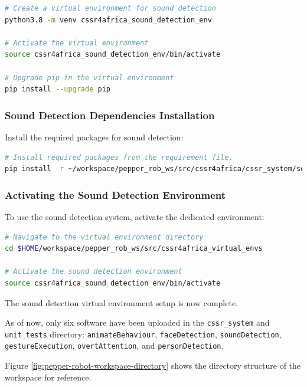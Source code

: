\documentclass{CSSRforAfrica}
\begin{document}
{\begin{lstlisting}[style=withoutNumbering, language=bash]
# Create a virtual environment for sound detection
python3.8 -m venv cssr4africa_sound_detection_env

# Activate the virtual environment
source cssr4africa_sound_detection_env/bin/activate

# Upgrade pip in the virtual environment
pip install --upgrade pip
\end{lstlisting}

\subsubsection*{Sound Detection Dependencies Installation}
Install the required packages for sound detection:
\begin{lstlisting}[style=withoutNumbering, language=bash]
# Install required packages from the requirement file.
pip install -r ~/workspace/pepper_rob_ws/src/cssr4africa/cssr_system/sound_detection/sound_detection_requirements.txt
\end{lstlisting}

\subsubsection*{Activating the Sound Detection Environment}
To use the sound detection system, activate the dedicated environment:
\begin{lstlisting}[style=withoutNumbering, language=bash]
# Navigate to the virtual environment directory
cd $HOME/workspace/pepper_rob_ws/src/cssr4africa_virtual_envs

# Activate the sound detection environment
source cssr4africa_sound_detection_env/bin/activate
\end{lstlisting}

The sound detection virtual environment setup is now complete.

\newpage

As of now, only six software have been uploaded in the \texttt{cssr\_system} and \texttt{unit\_tests} directory: \texttt{animateBehaviour}, \texttt{faceDetection}, \texttt{soundDetection}, \texttt{gestureExecution}, \texttt{overtAttention}, $ $and \texttt{personDetection}. 

Figure \ref{fig:pepper-robot-workspace-directory} shows the directory structure of the workspace for reference.
\begin{figure}[ht]

{\small 
{}
}


\end{figure}}
\end{document}
